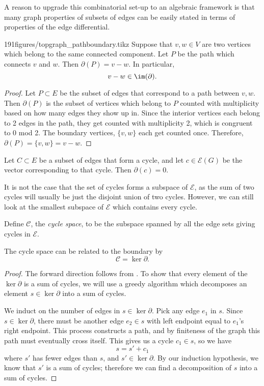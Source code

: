 A reason to upgrade this combinatorial set-up to an algebraic framework is that many graph properties of subsets of edges can be easily stated in terms of properties of the edge differential. 
\begin{claimfigureenv}{191figures/topgraph_pathboundary.tikz}
	Suppose that $v, w\in V$ are two vertices which belong to the same connected component.
	Let $P$ be the path which connects $v$ and $w$. Then $\partial(P)=v-w$. 
	In particular, 
	\[v-w\in \im (\partial).\] 
	\label{claim:pathsindifferential}
\end{claimfigureenv}

\begin{proof}
	Let $P\subset E$ be the subset of edges that correspond to a path between $v, w$. Then $\partial(P)$ is the subset of vertices which belong to $P$ counted with multiplicity based on how many edges they show up in. Since the interior vertices each belong to 2 edges in the path, they get counted with multiplicity 2, which is congruent to 0 mod 2. The boundary vertices, $\{v, w\}$ each get counted once. Therefore, $\partial(P)=\{v, w\}= v-w$. 
\end{proof}
\begin{corollary}
Let $C\subset E$ be a subset of edges that form a cycle, and let $c\in \mathcal E(G)$ be the vector corresponding to that cycle. Then $\partial(c)=0$. 
\end{corollary}
It is not the case that the set of cycles forms a subspace of $\mathcal E$, as the sum of two cycles will usually be just the disjoint union of two cycles. However, we can still look at the smallest subspace of $\mathcal E$ which contains every cycle. 
\begin{definition} Define $\mathcal C$, the \emph{cycle space}, to be the subspace spanned by all the edge sets giving cycles in $\mathcal E$.
\end{definition} 
\begin{claim}
The cycle space can be related to the boundary by 
\[\mathcal C = \ker \partial.\]
\label{claim:cyclespaceisker}
\end{claim}
\begin{proof}
The forward direction follows from . To show that every element of the $\ker\partial$ is a sum of cycles, we will use a greedy algorithm which decomposes an element $s\in \ker \partial $ into a sum of cycles.

We induct on the number of edges in  $s\in \ker \partial$. Pick any edge $e_1$ in $s$. Since $s\in \ker \partial$, there must be another edge $e_2\in s$ with left endpoint equal to $e_1$'s right endpoint. This process constructs a path, and by finiteness of the graph this path must eventually cross itself. This gives us a cycle $c_1\in s$, so we have 
\[s=s'+c_1\]
where $s'$ has fewer edges than $s$, and $s'\in \ker \partial$. By our induction hypothesis, we know that $s'$ is a sum of cycles; therefore we can find a decomposition of $s$ into a sum of cycles. 
\end{proof}
